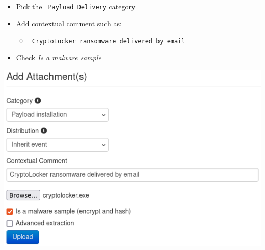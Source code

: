 \begin{frame}
    \begin{itemize}
        \item Pick the \texttt{\color{black} Payload Delivery} category
        \item Add contextual comment such as:
        \begin{itemize}
            \item \texttt{\color{black} CryptoLocker ransomware delivered by email}
        \end{itemize}
        \item Check \textit{\color{black} Is a malware sample}
    \end{itemize}
    \begin{center}
        \includegraphics[width=0.70\linewidth]{pictures/case2/attribute-bin.png}
    \end{center}
\end{frame}

